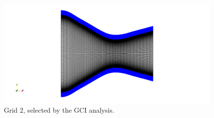 \documentclass[10pt,fleqn,a4paper,twoside]{article}
\begin{document}
\begin{figure}[!ht]
	\begin{center}
		\includegraphics[width=\textwidth]{images/mesh.png}
        \caption{Grid 2, selected by the GCI analysis.}
        \label{fig:grid_selected}
	\end{center}
\end{figure}
\end{document}
